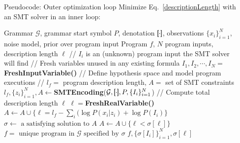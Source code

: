 \documentclass[final]{beamer}
\newlength{\onecolwid}
\newlength{\twocolwid}
\newcommand{\sem}[1]{[\mkern-6mu[#1]\mkern-6mu]} %
\begin{document}
\begin{frame}[t]
\begin{columns}[t]
\begin{column}{\twocolwid}
\begin{columns}[t,totalwidth=\twocolwid]
\begin{column}{\onecolwid}
\begin{block}{Pseudocode: Outer optimization loop}
Minimize Eq.~\ref{descriptionLength} with an SMT solver in an inner loop:
\begin{algorithm}[H] %
   \label{optimization}
\begin{algorithmic}
    Grammar $\mathcal{G}$, grammar start symbol $P$, denotation $\sem{\cdot}$, observations $\{x_i\}_{i = 1}^N$, noise model, prior over program input 
    Program $f$, $N$ program inputs, description length $\ell$
   \STATE // $I_i$ is an (unknown) program input the SMT solver will find
   \STATE // Fresh variables unused in any existing formula
   \STATE $I_1,I_2,\cdots,I_N = ${\bfseries FreshInputVariable()}
   \STATE // Define hypothesis space and model program executions
   \STATE // $l_f = $ program description length, $A = $ set of SMT constraints
   \STATE $l_f,\{z_i\}_{i = 1}^N,A\leftarrow${\bfseries SMTEncoding}($\mathcal{G}, \sem{\cdot}, P,\{I_i\}_{i = 1}^N$)
   \STATE // Compute total description length $\ell$
   \STATE $\ell = ${\bfseries FreshRealVariable()}
   \STATE $A\leftarrow A\cup \{\ell = l_f - \sum_i ( \log P(x_i|z_i) +  \log P(I_i) \}$
   \STATE $\sigma\leftarrow \text{ a satisfying solution to }A$
   \STATE $A\leftarrow A\cup \{ \ell < \sigma [\ell] \}$
   \ENDWHILE
    $f = \text{ unique program in $\mathcal{G}$ specified by $\sigma$}$
    $f,\{\sigma[I_i]\}_{i = 1}^N,\sigma[\ell]$
\end{algorithmic}
\end{algorithm}
\end{block}


  


\end{column} %

\begin{column}{\onecolwid}\vspace{-.6in} %



\end{column}
\end{columns}
\end{column}
\end{columns}
\end{frame}
\end{document}
